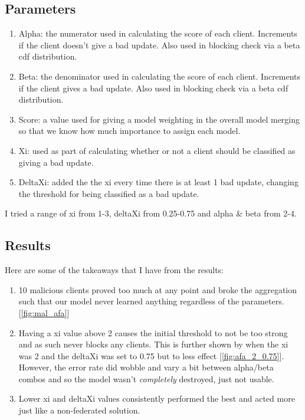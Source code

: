 \subsection{Parameters}
\begin{enumerate}
    \item Alpha: the numerator used in calculating the score of each client. Increments if the client doesn't give a bad update. Also used in blocking check via a beta cdf distribution.
    \item Beta: the denominator used in calculating the score of each client. Increments if the client gives a bad update. Also used in blocking check via a beta cdf distribution.
    \item Score: a value used for giving a model weighting in the overall model merging so that we know how much importance to assign each model.
    \item Xi: used as part of calculating whether or not a client should be classified as giving a bad update.
    \item DeltaXi: added the the xi every time there is at least 1 bad update, changing the threshold for being classified as a bad update.
\end{enumerate}
I tried a range of xi from 1-3, deltaXi from 0.25-0.75 and alpha \& beta from 2-4.

\subsection{Results}
Here are some of the takeaways that I have from the results:
\begin{enumerate}
    \item 10 malicious clients proved too much at any point and broke the aggregation such that our model never learned anything regardless of the parameters. [\ref{fig:mal_afa}]
    \item Having a xi value above 2 causes the initial threshold to not be too strong and as such never blocks any clients. This is further shown by when the xi was 2 and the deltaXi was set to 0.75 but to less effect [\ref{fig:afa_2_0.75}]. 
    However, the error rate did wobble and vary a bit between alpha/beta combos and so the model wasn't \textit{completely} destroyed, just not usable.
    \item Lower xi and deltaXi values consistently performed the best and acted more just like a non-federated solution.
\end{enumerate}

